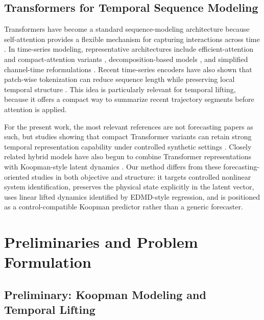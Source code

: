 \documentclass[journal]{IEEEtran}
\begin{document}
\subsection{Transformers for Temporal Sequence Modeling}

Transformers have become a standard sequence-modeling architecture because self-attention provides a flexible mechanism for capturing interactions across time \cite{vaswani2017attention}. In time-series modeling, representative architectures include efficient-attention and compact-attention variants \cite{zhou2021informer, wang2020linformer, katharopoulos2020transformers, choromanski2021performer}, decomposition-based models \cite{wu2021autoformer, zhou2022fedformer}, and simplified channel-time reformulations \cite{zeng2023transformers, liu2024itransformer}. Recent time-series encoders have also shown that patch-wise tokenization can reduce sequence length while preserving local temporal structure \cite{nie2023time}. This idea is particularly relevant for temporal lifting, because it offers a compact way to summarize recent trajectory segments before attention is applied.

For the present work, the most relevant references are not forecasting papers as such, but studies showing that compact Transformer variants can retain strong temporal representation capability under controlled synthetic settings \cite{forootani2026compact, forootani2025synthetic}. Closely related hybrid models have also begun to combine Transformer representations with Koopman-style latent dynamics \cite{forootani2026deepkoopformer, forootani2026spectral}. Our method differs from these forecasting-oriented studies in both objective and structure: it targets controlled nonlinear system identification, preserves the physical state explicitly in the latent vector, uses linear lifted dynamics identified by EDMD-style regression, and is positioned as a control-compatible Koopman predictor rather than a generic forecaster.

\section{Preliminaries and Problem Formulation}

\subsection{Preliminary: Koopman Modeling and Temporal Lifting}
\label{sec:preliminary}
\end{document}
